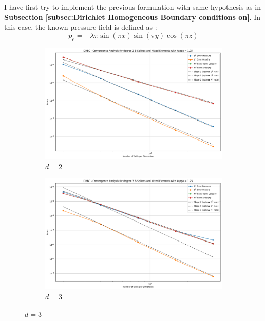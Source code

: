 \documentclass[a4paper,12pt,twoside]{report}
\begin{document}
I have first try to implement the previous formulation with same hypothesis as in \textbf{Subsection \ref{subsec:Dirichlet Homogeneous Boundary conditions on}}. In this case, the known pressure field is defined as : 
$$p_e = -\lambda \pi \sin(\pi x)\sin(\pi y)\cos(\pi z)$$


\begin{figure}[!h]
	\centering
	\begin{subfigure}[b]{0.49\textwidth}
		\centering
		\includegraphics[width=\textwidth]{convergence_degree_2_mixed_dirichlet_homogeneous_kappa=1.25}
		\caption{$d=2$}
		\label{fig:convergencedegree2mixeddirichlethomogeneouskappa1}
	\end{subfigure}
	\begin{subfigure}[b]{0.49\textwidth}
		\centering
		\includegraphics[width=\textwidth]{convergence_degree_3_mixed_dirichlet_homogeneous_kappa=1.25}
		\caption{$d=3$}
		\label{fig:convergencedegree3mixeddirichlethomogeneouskappa1}
	\end{subfigure}

\end{figure}
\end{document}
